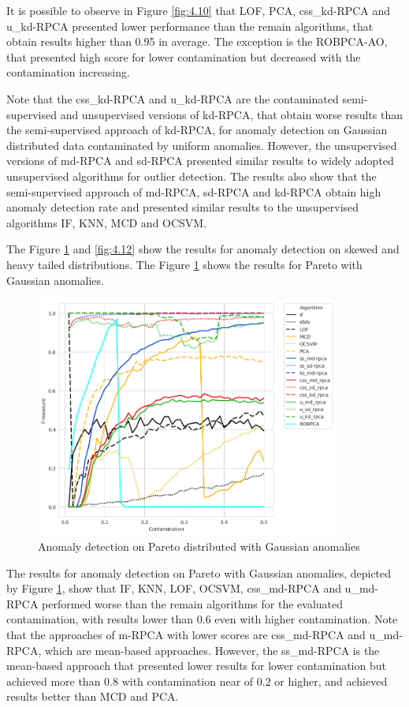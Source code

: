 It is possible to observe in Figure \ref{fig:4.10} that LOF, PCA, css\_kd-RPCA and u\_kd-RPCA presented lower performance than the remain algorithms, that obtain results higher than 0.95 in average. The exception is the ROBPCA-AO, that presented high score for lower contamination but decreased with the contamination increasing. 

Note that the css\_kd-RPCA and u\_kd-RPCA are the contaminated semi-supervised and unsupervised versions of kd-RPCA, that obtain worse results than the semi-supervised approach of kd-RPCA, for anomaly detection on Gaussian distributed data contaminated by uniform anomalies. However, the unsupervised versions of md-RPCA and sd-RPCA presented similar results to widely adopted unsupervised algorithms for outlier detection. The results also show that the semi-supervised approach of md-RPCA, sd-RPCA and kd-RPCA obtain high anomaly detection rate and presented similar results to the unsupervised algorithms IF, KNN, MCD and OCSVM. 

The Figure \ref{fig:4.11} and \ref{fig:4.12} show the results for anomaly detection on skewed and heavy tailed distributions. The Figure \ref{fig:4.11} shows the results for Pareto with Gaussian anomalies.

\begin{figure}[h!]
	\centering
	\includegraphics[width=10cm]{figs/ch4/pareto_f1_contamination.png}
	\caption{Anomaly detection on Pareto distributed with Gaussian anomalies}
	\label{fig:4.11}
\end{figure}

The results for anomaly detection on Pareto with Gaussian anomalies, depicted by Figure \ref{fig:4.11}, show that IF, KNN, LOF, OCSVM, css\_md-RPCA and u\_md-RPCA performed worse than the remain algorithms for the evaluated contamination, with results lower than 0.6 even with higher contamination. Note that the approaches of m-RPCA with lower scores are css\_md-RPCA and u\_md-RPCA, which are mean-based approaches. However, the ss\_md-RPCA is the mean-based approach that presented lower results for lower contamination but achieved more than 0.8 with contamination near of 0.2 or higher, and achieved results better than MCD and PCA.

